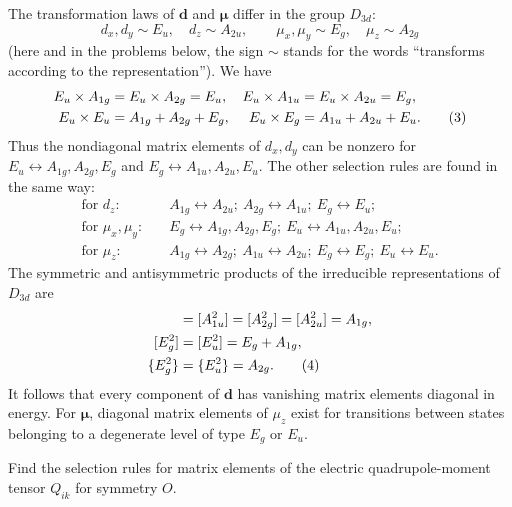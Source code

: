 \SolutionHeading The transformation laws of $\mathbf d$ and
$\boldsymbol\mu$ differ in the group $D_{3d}$:
\[
 d_x,d_y\sim E_u,\quad d_z\sim A_{2u},\qquad
 \mu_x,\mu_y\sim E_g,\quad \mu_z\sim A_{2g}
\]
(here and in the problems below, the sign $\sim$ stands for the words
``transforms according to the representation''). We have
\begin{align}
 E_u\times A_{1g}&=E_u\times A_{2g}=E_u,&E_u\times A_{1u}&=E_u\times A_{2u}=E_g,\notag\\
 E_u\times E_u&=A_{1g}+A_{2g}+E_g,&E_u\times E_g&=A_{1u}+A_{2u}+E_u.\tag{3}
\end{align}
Thus the nondiagonal matrix elements of $d_x,d_y$ can be nonzero for
$E_u\leftrightarrow A_{1g},A_{2g},E_g$ and
$E_g\leftrightarrow A_{1u},A_{2u},E_u$. The other selection rules are found
in the same way:
\begin{align*}
\text{for }d_z:\quad&A_{1g}\leftrightarrow A_{2u};\ A_{2g}\leftrightarrow A_{1u};\ E_g\leftrightarrow E_u;\\
\text{for }\mu_x,\mu_y:\quad&E_g\leftrightarrow A_{1g},A_{2g},E_g;\ E_u\leftrightarrow A_{1u},A_{2u},E_u;\\
\text{for }\mu_z:\quad&A_{1g}\leftrightarrow A_{2g};\ A_{1u}\leftrightarrow A_{2u};\ E_g\leftrightarrow E_g;\ E_u\leftrightarrow E_u.
\end{align*}
The symmetric and antisymmetric products of the irreducible representations
of $D_{3d}$ are
\begin{align}
 [A_{1g}^2]&=[A_{1u}^2]=[A_{2g}^2]=[A_{2u}^2]=A_{1g},\notag\\
 [E_g^2]&=[E_u^2]=E_g+A_{1g},\notag\\
 \{E_g^2\}&=\{E_u^2\}=A_{2g}.\tag{4}
\end{align}
It follows that every component of $\mathbf d$ has vanishing matrix elements
diagonal in energy. For $\boldsymbol\mu$, diagonal matrix elements of $\mu_z$
exist for transitions between states belonging to a degenerate level of type
$E_g$ or $E_u$.

 Find the selection rules for matrix elements of the
electric quadrupole-moment tensor $Q_{ik}$ for symmetry $O$.

